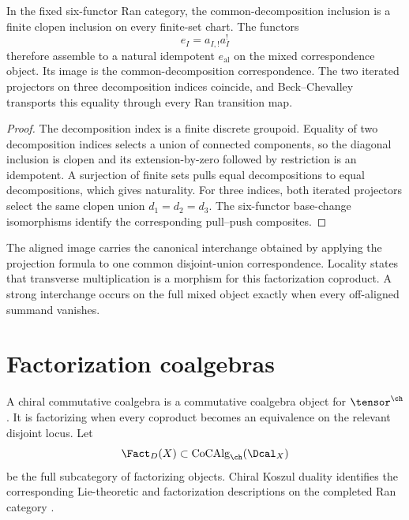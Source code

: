 \begin{theorem}
In the fixed six-functor Ran category, the common-decomposition inclusion is a finite clopen inclusion on every finite-set chart.  The functors
\[
 e_I=a_{I,!}a_I^!
\]
therefore assemble to a natural idempotent $e_{\mathrm{al}}$ on the mixed correspondence object.  Its image is the common-decomposition correspondence.  The two iterated projectors on three decomposition indices coincide, and Beck--Chevalley transports this equality through every Ran transition map.
\end{theorem}
\begin{proof}
The decomposition index is a finite discrete groupoid.  Equality of two decomposition indices selects a union of connected components, so the diagonal inclusion is clopen and its extension-by-zero followed by restriction is an idempotent.  A surjection of finite sets pulls equal decompositions to equal decompositions, which gives naturality.  For three indices, both iterated projectors select the same clopen union $d_1=d_2=d_3$.  The six-functor base-change isomorphisms identify the corresponding pull--push composites.
\end{proof}

The aligned image carries the canonical interchange obtained by applying the projection formula to one common disjoint-union correspondence.  Locality states that transverse multiplication is a morphism for this factorization coproduct.  A strong interchange occurs on the full mixed object exactly when every off-aligned summand vanishes.

\section{Factorization coalgebras}
A chiral commutative coalgebra is a commutative coalgebra object for $\tensor^{\ch}$. It is factorizing when every coproduct becomes an equivalence on the relevant disjoint locus. Let
\[
 \Fact_D(X)\subset \operatorname{CoCAlg}_{\ch}(\Dcal_X)
\]
be the full subcategory of factorizing objects. Chiral Koszul duality identifies the corresponding Lie-theoretic and factorization descriptions on the completed Ran category \cite{FG12,Heuts}.

